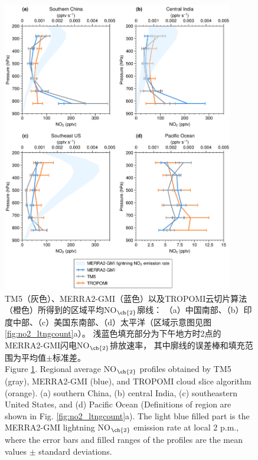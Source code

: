 \begin{figure}[H]
    \centering
    \includegraphics[width=0.9\textwidth]{./figures/utno2_profile.png}
    \caption{
    TM5（灰色）、MERRA2-GMI（蓝色）以及TROPOMI云切片算法（橙色）所得到的区域平均NO$_{\ch{2}}$廓线：
    （a）中国南部、（b）印度中部、（c）美国东南部、（d）太平洋（区域示意图见图\ref{fig:no2_ltngcount}a）。
    浅蓝色填充部分为下午地方时2点的MERRA2-GMI闪电NO$_{\ch{2}}$排放速率，
    其中廓线的误差棒和填充范围为平均值$\pm$标准差。\\
    Figure \ref{fig:utno2_profile}. Regional average NO$_{\ch{2}}$ profiles obtained by TM5 (gray), MERRA2-GMI (blue), and TROPOMI cloud slice algorithm (orange).
    (a) southern China, (b) central India, (c) southeastern United States, and (d) Pacific Ocean
    (Definitions of region are shown in Fig. \ref{fig:no2_ltngcount}a).
    The light blue filled part is the MERRA2-GMI lightning NO$_{\ch{2}}$ emission rate at local 2 p.m.,
    where the error bars and filled ranges of the profiles are the mean values $\pm$ standard deviations.
    }
    \label{fig:utno2_profile}
\end{figure}


